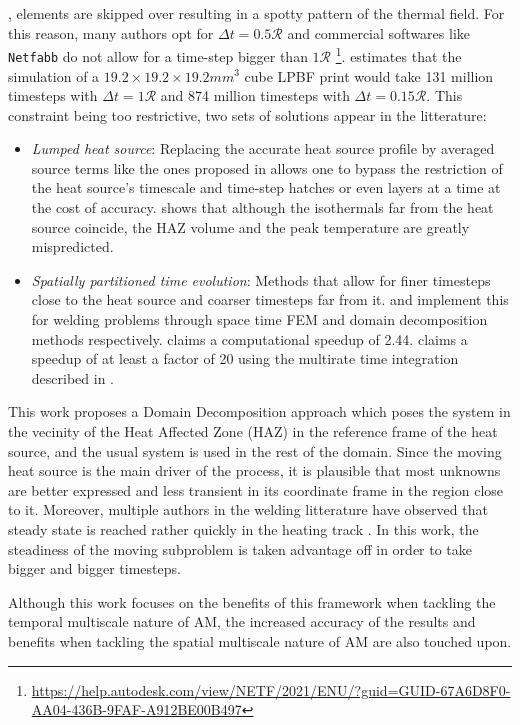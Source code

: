 , elements are skipped over resulting
in a spotty pattern of the thermal field.
For this reason, many authors opt for
$\Delta t = 0.5\mathcal{R}$ \citep{Patil2021, Michaleris2014, Stender2018}
and commercial softwares like \texttt{Netfabb}
do not allow for a time-step bigger than $1 \mathcal{R}$
\footnote{\url{https://help.autodesk.com/view/NETF/2021/ENU/?guid=GUID-67A6D8F0-AA04-436B-9FAF-A912BE00B497}}.
\citep{Hodge2021} estimates that the simulation of a
$19.2 \times 19.2 \times 19.2 mm^3$ cube LPBF print would take 
131 million timesteps with $\Delta t = 1 \mathcal{R}$ and
874 million timesteps with $\Delta t = 0.15 \mathcal{R}$.
This constraint being too restrictive, two sets of solutions
appear in the litterature:

\begin{itemize}
  \item \textit{Lumped heat source}: Replacing the accurate
    heat source profile by averaged source terms
    like the ones proposed in \citep{Chiumenti2017, Malmelv2019}
    allows one to bypass the restriction of
    the heat source's timescale and time-step hatches
    or even layers at a time at the cost of accuracy.
    \citep{VanElsen2007} shows that although the
    isothermals far from the heat source coincide,
    the HAZ volume and the peak temperature are
    greatly mispredicted.
  \item \textit{Spatially partitioned time evolution}: Methods
    that allow for finer timesteps close to the heat source
    and coarser timesteps far from it. \citep{Kopp2022} and
    \citep{Viguerie2022} implement this for welding problems
    through space time FEM and domain decomposition methods respectively.
    \citep{Viguerie2022} claims a computational speedup of 2.44.
    \citep{Puso2023} claims a speedup of at least a factor of 20
    using the multirate time integration described in \citep{Hodge2021}.
\end{itemize}

This work proposes a Domain Decomposition approach which poses the
system in the vecinity of the Heat Affected Zone (HAZ) in the
reference frame of the heat source, and the usual system is used
in the rest of the domain. Since the moving heat source is the main driver
of the process, it is plausible that most unknowns are
better expressed and less transient in its coordinate frame in the region close to it.
Moreover, multiple authors in the welding litterature
have observed that steady state is reached rather quickly in the heating track
\citep{Mundra1996, VanElsen2007, Powar2016}. In this work,
the steadiness of the moving subproblem is taken advantage off 
in order to take bigger and bigger timesteps.\par

Although this work focuses on the benefits of this framework
when tackling the temporal multiscale nature of AM,
the increased accuracy of the results and benefits
when tackling the spatial multiscale nature of AM \citep{Storti2022, carraturo2021twolevel}
are also touched upon.\par
